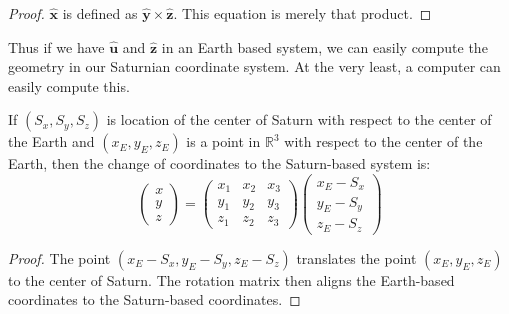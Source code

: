 \documentclass[crop=false,class=book,oneside]{standalone}
\begin{document}
        \begin{proof}
            $\hat{\mathbf{x}}$ is defined as
            $\hat{\mathbf{y}}\times\hat{\mathbf{z}}$.
            This equation is merely that product.
        \end{proof}
        Thus if we have $\hat{\mathbf{u}}$ and
        $\hat{\mathbf{z}}$ in an Earth based system,
        we can easily compute the geometry in our
        Saturnian coordinate system. At the very least,
        a computer can easily compute this.
        \begin{theorem}
            If $(S_{x},S_{y},S_{z})$ is location of the
            center of Saturn with respect to the
            center of the Earth and $(x_{E},y_{E},z_{E})$
            is a point in $\mathbb{R}^{3}$ with respect
            to the center of the Earth, then the
            change of coordinates to the
            Saturn-based system is:
            \begin{equation*}
                    \begin{pmatrix}
                        x\\
                        y\\
                        z
                    \end{pmatrix}
                    =
                    \begin{pmatrix}
                        x_{1}&x_{2}&x_{3}\\
                        y_{1}&y_{2}&y_{3}\\
                        z_{1}&z_{2}&z_{3}
                    \end{pmatrix}
                    \begin{pmatrix}
                        x_{E}-S_{x}\\
                        y_{E}-S_{y}\\
                        z_{E}-S_{z}
                    \end{pmatrix}
                \end{equation*}
        \end{theorem}
        \begin{proof}
            The point
            $(x_{E}-S_{x},y_{E}-S_{y},z_{E}-S_{z})$
            translates the point $(x_{E},y_{E},z_{E})$
            to the center of Saturn.
            The rotation matrix then aligns the
            Earth-based coordinates to the
            Saturn-based coordinates.
        \end{proof}
\end{document}
